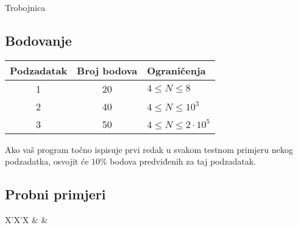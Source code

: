 \begin{statement}[
  problempoints=110,
  timelimit=1 sekunda,
  memorylimit=512 MiB,
]{Trobojnica}
\subsection*{Bodovanje}
{\renewcommand{\arraystretch}{1.4}
  \setlength{\tabcolsep}{6pt}
  \begin{tabular}{ccl}
 Podzadatak & Broj bodova & Ograničenja \\ \midrule
  1 & 20 & $4 \le N \le 8$ \\
  2 & 40 & $4 \le N \le 10^3$ \\
  3 & 50 & $4 \le N \le 2\cdot10^5$ \\
\end{tabular}}

Ako vaš program točno ispisuje prvi redak u svakom testnom primjeru nekog
podzadatka, osvojit će $10\%$ bodova predviđenih za taj podzadatak.

\subsection*{Probni primjeri}
\begin{tabularx}{\textwidth}{X'X'X}
 &
 &
\end{tabularx}




\end{statement}

